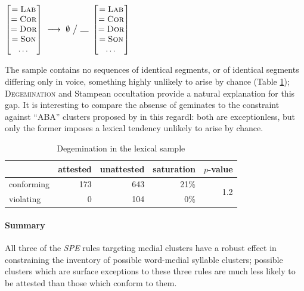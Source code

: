 \begin{example}
$\begin{bmatrix} =\textsc{Lab} \\ =\textsc{Cor} \\ =\textsc{Dor} \\ =\textsc{Son} \\ \ldots{} \end{bmatrix}~\goesto~\emptyset~\big /~\gap~\begin{bmatrix} =\textsc{Lab} \\ =\textsc{Cor} \\ =\textsc{Dor} \\ =\textsc{Son} \\ \ldots{} \end{bmatrix}$
\end{example}

\noindent
The sample contains no sequences of identical segments, or of identical segments differing only in voice, something highly unlikely to arise by chance (Table \ref{degemtab}); \textsc{Degemination} and Stampean occultation provide a natural explanation for this gap.
It is interesting to compare the absense of geminates to the constraint against ``ABA'' clusters proposed by \citeauthor{Pierrehumbert1994} in this regardl: both are exceptionless, but only the former imposes a lexical tendency unlikely to arise by chance.

\begin{table}
\centering
\begin{tabular}{l rrrr}
\toprule
           & attested & unattested & saturation & $p$-value \\
\midrule
conforming & 173      & 643        & 21\%       & \multirow{2}{*}{1.2\e{-10}} \\
violating  & 0        & 104        & 0\%        \\
\bottomrule
\end{tabular}
\caption{Degemination in the lexical sample}
\label{degemtab}
\end{table}

\paragraph{Summary} All three of the \emph{SPE} rules targeting medial clusters have a robust effect in constraining the inventory of possible word-medial syllable clusters; possible clusters which are surface exceptions to these three rules are much less likely to be attested than those which conform to them.

